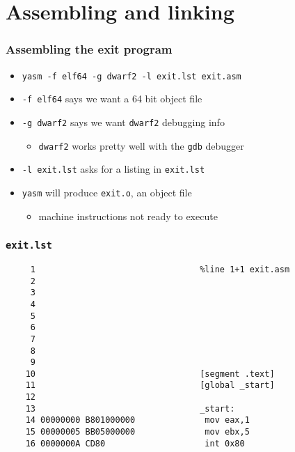 \documentclass{beamer}
\begin{document}
\section{Assembling and linking}

\begin{frame}
    \frametitle{Assembling the exit program}
    \begin{itemize}
        \item {\tt yasm -f elf64 -g dwarf2 -l exit.lst exit.asm}
        \item {\tt -f elf64} says we want a 64 bit object file
        \item {\tt -g dwarf2} says we want {\tt dwarf2} debugging info
        \begin{itemize}
            \item {\tt dwarf2} works pretty well with the {\tt gdb} debugger
        \end{itemize}
        \item {\tt -l exit.lst} asks for a listing in {\tt exit.lst}
        \item {\tt yasm} will produce {\tt exit.o}, an object file
        \begin{itemize}
            \item machine instructions not ready to execute
        \end{itemize}
    \end{itemize}
\end{frame}

\begin{frame}[fragile]
\frametitle{\tt exit.lst}
\begin{verbatim}
     1                                 %line 1+1 exit.asm
     2                                 
     3                                 
     4                                 
     5                                 
     6                                 
     7                                 
     8                                 
     9                                 
    10                                 [segment .text]
    11                                 [global _start]
    12                                 
    13                                 _start:
    14 00000000 B801000000              mov eax,1
    15 00000005 BB05000000              mov ebx,5
    16 0000000A CD80                    int 0x80
\end{verbatim}
\end{frame}
\end{document}
